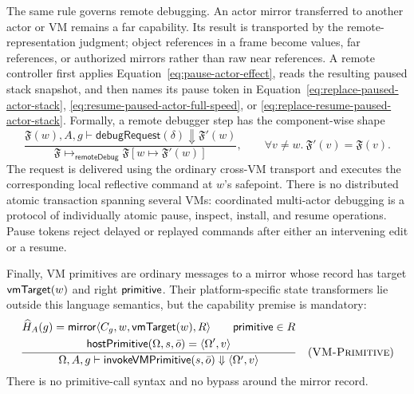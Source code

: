 The same rule governs remote debugging.  An actor mirror transferred to
another actor or VM remains a far capability.  Its  result
is transported by the remote-representation judgment; object references in a
frame become values, far references, or authorized mirrors rather than raw
near references.  A remote controller first applies
Equation~\eqref{eq:pause-actor-effect}, reads the resulting paused stack
snapshot, and then names its pause token in
Equation~\eqref{eq:replace-paused-actor-stack},
\eqref{eq:resume-paused-actor-full-speed}, or
\eqref{eq:replace-resume-paused-actor-stack}.  Formally, a remote debugger step
has the component-wise shape
\begin{equation}\label{eq:remote-debugger-component-step}
 \frac{\mathfrak F(w),A,g\vdash\mathsf{debugRequest}(\delta)
          \Downarrow\mathfrak F'(w)}
      {\mathfrak F\longmapsto_{\mathsf{remoteDebug}}
       \mathfrak F[w\mapsto\mathfrak F'(w)]},
 \qquad
 \forall v\ne w.\ \mathfrak F'(v)=\mathfrak F(v).
\end{equation}
The request is delivered using the ordinary cross-VM transport and executes
the corresponding local reflective command at $w$'s safepoint.  There is no
distributed atomic transaction spanning several VMs: coordinated multi-actor
debugging is a protocol of individually atomic pause, inspect, install, and
resume operations.  Pause tokens reject delayed or replayed commands after
either an intervening edit or a resume.

Finally, VM primitives are ordinary messages to a mirror whose record has
target $\mathsf{vmTarget}(w)$ and right $\mathsf{primitive}$.  Their platform-specific state
transformers lie outside this language semantics, but the capability premise
is mandatory:
\[
\dfrac{\begin{gathered}
       \widehat H_A(g)=\mathsf{mirror}\langle C_g,w,\mathsf{vmTarget}(w),R\rangle
       \qquad\mathsf{primitive}\in R\\
       \mathsf{hostPrimitive}(\Omega,s,\bar o)=\langle\Omega',v\rangle
       \end{gathered}}
 {\Omega,A,g\vdash\mathsf{invokeVMPrimitive}(s,\bar o)
       \Downarrow\langle\Omega',v\rangle}
\quad(\textsc{VM-Primitive})
\]
There is no primitive-call syntax and no bypass around the mirror record.
